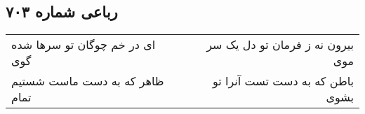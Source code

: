 \begin{center}
\section*{رباعی شماره ۷۰۳}
\label{sec:sh703}
\begin{longtable}{l p{0.5cm} r}
ای در خم چوگان تو سرها شده گوی
&&
بیرون نه ز فرمان تو دل یک سر موی
\\
ظاهر که به دست ماست شستیم تمام
&&
باطن که به دست تست آنرا تو بشوی
\\
\end{longtable}
\end{center}
